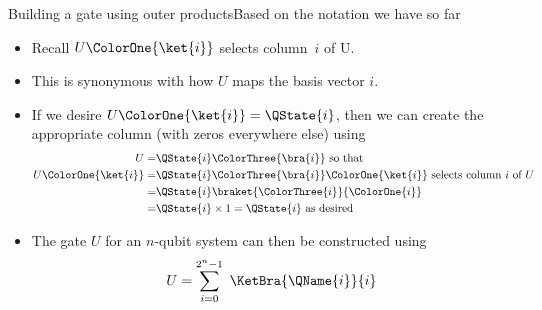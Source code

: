 \begin{frame}{Building a gate using outer products}{Based on the notation we have so far}

\begin{itemize}
    \item Recall $U\ColorOne{\ket{i}}$ selects column~$i$ of U.
    \item This is synonymous with how $U$ maps the basis vector $i$.
    \item If we desire $U\ColorOne{\ket{i}}=\QState{i}$, then we can create the appropriate column (with zeros everywhere else) using
    \begin{align*}
    U =& \QState{i}\ColorThree{\bra{i}} \mbox{ so that}\\
    U\ColorOne{\ket{i}} =& \QState{i}\ColorThree{\bra{i}}\ColorOne{\ket{i}} \mbox{ selects column $i$ of $U$}\\
    =& \QState{i}\braket{\ColorThree{i}}{\ColorOne{i}} \\
    =& \QState{i}\times 1 = \QState{i} \mbox{ as desired}
    \end{align*}
    \item The gate $U$ for an $n$-qubit system can then be constructed using 
    \[
   U =  \sum_{i=0}^{2^{n}-1}\ \KetBra{\QName{i}}{i} \]
\end{itemize}
    
\end{frame}

